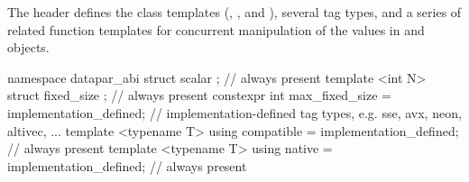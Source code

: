

\pnum
The header  defines the class templates (\datapar, \mask, and ), several tag types, and a series of related function templates for concurrent manipulation of the values in \datapar and \mask objects.


\begin{itemdecl}
namespace datapar_abi {
  struct scalar {};  // always present
  template <int N> struct fixed_size {};  // always present
  constexpr int max_fixed_size = implementation_defined;
  // implementation-defined tag types, e.g. sse, avx, neon, altivec, ...
  template <typename T> using compatible = implementation_defined;  // always present
  template <typename T> using native = implementation_defined;  // always present
}
\end{itemdecl}
